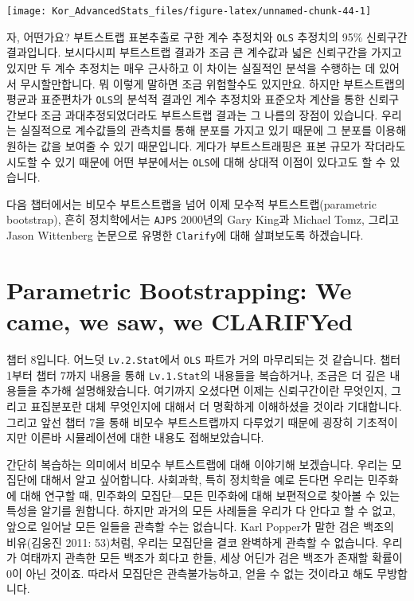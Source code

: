 \documentclass[
]{book}
\begin{document}
\begin{center}\texttt{[image: Kor\_AdvancedStats\_files/figure-latex/unnamed-chunk-44-1]} \end{center}

자, 어떤가요? 부트스트랩 표본추출로 구한 계수 추정치와 \texttt{OLS} 추정치의 95\% 신뢰구간 결과입니다. 보시다시피 부트스트랩 결과가 조금 큰 계수값과 넓은 신뢰구간을 가지고 있지만 두 계수 추정치는 매우 근사하고 이 차이는 실질적인 분석을 수행하는 데 있어서 무시할만합니다. 뭐 이렇게 말하면 조금 위험할수도 있지만요. 하지만 부트스트랩의 평균과 표준편차가 \texttt{OLS}의 분석적 결과인 계수 추정치와 표준오차 계산을 통한 신뢰구간보다 조금 과대추정되었더라도 부트스트랩 결과는 그 나름의 장점이 있습니다. 우리는 실질적으로 계수값들의 관측치를 통해 분포를 가지고 있기 때문에 그 분포를 이용해 원하는 값을 보여줄 수 있기 때문입니다. 게다가 부트스트래핑은 표본 규모가 작더라도 시도할 수 있기 때문에 어떤 부분에서는 \texttt{OLS}에 대해 상대적 이점이 있다고도 할 수 있습니다.

다음 챕터에서는 비모수 부트스트랩을 넘어 이제 모수적 부트스트랩(parametric bootstrap), 흔히 정치학에서는 \texttt{AJPS} 2000년의 Gary King과 Michael Tomz, 그리고 Jason Wittenberg 논문으로 유명한 \texttt{Clarify}에 대해 살펴보도록 하겠습니다.

\hypertarget{parametric-bootstrapping-we-came-we-saw-we-clarifyed}{%
\chapter{Parametric Bootstrapping: We came, we saw, we CLARIFYed}\label{parametric-bootstrapping-we-came-we-saw-we-clarifyed}}

챕터 8입니다. 어느덧 \texttt{Lv.2.Stat}에서 \texttt{OLS} 파트가 거의 마무리되는 것 같습니다. 챕터 1부터 챕터 7까지 내용을 통해 \texttt{Lv.1.Stat}의 내용들을 복습하거나, 조금은 더 깊은 내용들을 추가해 설명해왔습니다. 여기까지 오셨다면 이제는 신뢰구간이란 무엇인지, 그리고 표집분포란 대체 무엇인지에 대해서 더 명확하게 이해하셨을 것이라 기대합니다. 그리고 앞선 챕터 7을 통해 비모수 부트스트랩까지 다루었기 때문에 굉장히 기초적이지만 이른바 시뮬레이션에 대한 내용도 접해보았습니다.

간단히 복습하는 의미에서 비모수 부트스트랩에 대해 이야기해 보겠습니다. 우리는 모집단에 대해서 알고 싶어합니다. 사회과학, 특히 정치학을 예로 든다면 우리는 민주화에 대해 연구할 때, 민주화의 모집단---모든 민주화에 대해 보편적으로 찾아볼 수 있는 특성을 알기를 원합니다. 하지만 과거의 모든 사례들을 우리가 다 안다고 할 수 없고, 앞으로 일어날 모든 일들을 관측할 수는 없습니다. Karl Popper가 말한 검은 백조의 비유(김웅진 2011: 53)처럼, 우리는 모집단을 결코 완벽하게 관측할 수 없습니다. 우리가 여태까지 관측한 모든 백조가 희다고 한들, 세상 어딘가 검은 백조가 존재할 확률이 0이 아닌 것이죠. 따라서 모집단은 관측불가능하고, 얻을 수 없는 것이라고 해도 무방합니다.
\end{document}
